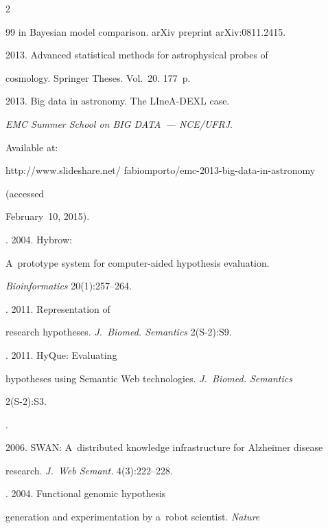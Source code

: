 \begin{multicols}{2}
{{\begin{thebibliography}{99}
in Bayesian model comparison. arXiv preprint arXiv:0811.2415.




 2013. Advanced statistical methods for astrophysical probes of


cosmology. {Springer Theses}. Vol.~20. 177~p.




 2013. Big data in astronomy. The LIneA-DEXL case.


\textit{EMC Summer School on BIG DATA~--- NCE/UFRJ}.


Available at: {\sf


http://www.slideshare.net/ fabiomporto/emc-2013-big-data-in-astronomy} (accessed


February~10, 2015).




. 2004. Hybrow:


A~prototype system for computer-aided hypothesis evaluation.


\textit{Bioinformatics} 20(1):257--264.




. 2011. Representation of


research hypotheses. \textit{J.~Biomed. Semantics} 2(S-2):S9.




. 2011. HyQue: Evaluating


hypotheses using Semantic Web technologies. \textit{J.~Biomed. Semantics}


 2(S-2):S3.




.


2006. SWAN: A~distributed knowledge infrastructure for Alzheimer disease


research. \textit{J.~Web Semant.} 4(3):222--228.




. 2004. Functional genomic hypothesis


generation and experimentation by a~robot scientist. \textit{Nature}



\end{thebibliography}}}
\end{multicols}
